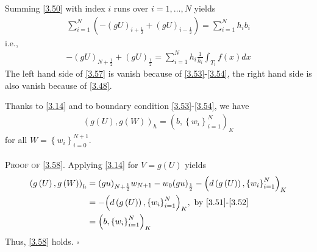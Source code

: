 \documentclass[a4paper]{article}
\numberwithin{equation}{section}
\begin{document}
Summing \eqref{3.50} with index $i$ runs over $i=1,\ldots,N$ yields
\begin{align}
\sum\limits_{i = 1}^N {\left( { - {{\left( {gU} \right)}_{i + \frac{1}{2}}} + {{\left( {gU} \right)}_{i - \frac{1}{2}}}} \right)}  = \sum\limits_{i = 1}^N {{h_i}{b_i}}
\end{align}
i.e.,
\begin{align}
\label{3.57}
- {\left( {gU} \right)_{N + \frac{1}{2}}} + {\left( {gU} \right)_{\frac{1}{2}}} = \sum\limits_{i = 1}^N {{h_i}\frac{1}{{{h_i}}}\int_{{T_i}} {f\left( x \right)dx} } 
\end{align}
The left hand side of \eqref{3.57} is vanish because of \eqref{3.53}-\eqref{3.54}, the right hand side is also vanish because of \eqref{3.48}. 

Thanks to \eqref{3.14} and to boundary condition \eqref{3.53}-\eqref{3.54}, we have
\begin{align}
\label{3.58}
\left( {g\left( U \right),g\left( W \right)} \right)_h = {\left( {b,\left\{ {{w_i}} \right\}_{i = 1}^N} \right)_K}
\end{align}
for all $W=\left\{ {{w_i}} \right\}_{i = 0}^{N + 1}$.\\
\\
\textsc{Proof of \eqref{3.58}.} Applying \eqref{3.14} for $V=g\left(U\right)$ yields
\begin{align}
{\left( {g\left( U \right),g\left( W \right)} \right)_h} &= {\left( gu \right)_{N + \frac{1}{2}}}{w_{N + 1}} - {w_0}{\left( gu \right)_{\frac{1}{2}}} - {\left( {d\left( {g\left( U \right)} \right),\left\{ {{w_i}} \right\}_{i = 1}^N} \right)_K}\\
 &=  - {\left( {d\left( {g\left( U \right)} \right),\left\{ {{w_i}} \right\}_{i = 1}^N} \right)_K},\mbox{ by \eqref{3.51}-\eqref{3.52}}\\
 &= {\left( {b,\left\{ {{w_i}} \right\}_{i = 1}^N} \right)_K}
\end{align}
Thus, \eqref{3.58} holds. \hfill $\square$\\
\end{document}
